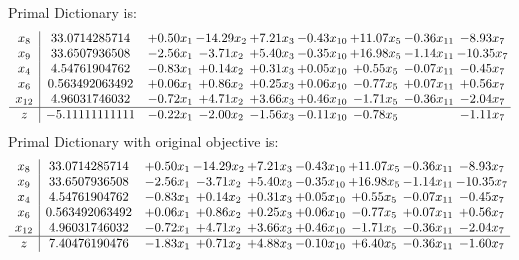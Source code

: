 \documentclass[8pt]{article}
\begin{document}
Primal Dictionary is:
\[\begin{array}{c| c c@{\hskip 2pt} c@{\hskip 2pt} c@{\hskip 2pt} c@{\hskip 2pt} c@{\hskip 2pt} c@{\hskip 2pt} c@{\hskip 2pt} }
 x_{8}   &  33.0714285714 & +  0.50 x_{1} & -14.29 x_{2} & +  7.21 x_{3} & -0.43 x_{10} & + 11.07 x_{5} & -0.36 x_{11} & -8.93 x_{7}\\
 x_{9}   &  33.6507936508 & -2.56 x_{1} & -3.71 x_{2} & +  5.40 x_{3} & -0.35 x_{10} & + 16.98 x_{5} & -1.14 x_{11} & -10.35 x_{7}\\
 x_{4}   &  4.54761904762 & -0.83 x_{1} & +  0.14 x_{2} & +  0.31 x_{3} & +  0.05 x_{10} & +  0.55 x_{5} & -0.07 x_{11} & -0.45 x_{7}\\
 x_{6}   &  0.563492063492 & +  0.06 x_{1} & +  0.86 x_{2} & +  0.25 x_{3} & +  0.06 x_{10} & -0.77 x_{5} & +  0.07 x_{11} & +  0.56 x_{7}\\
 x_{12}   &  4.96031746032 & -0.72 x_{1} & +  4.71 x_{2} & +  3.66 x_{3} & +  0.46 x_{10} & -1.71 x_{5} & -0.36 x_{11} & -2.04 x_{7}\\
\hline
z    &  -5.11111111111 & -0.22 x_{1} & -2.00 x_{2} & -1.56 x_{3} & -0.11 x_{10} & -0.78 x_{5} &   & -1.11 x_{7}\\
\end{array}\]
Primal Dictionary with original objective is:
\[\begin{array}{c| c c@{\hskip 2pt} c@{\hskip 2pt} c@{\hskip 2pt} c@{\hskip 2pt} c@{\hskip 2pt} c@{\hskip 2pt} c@{\hskip 2pt} }
 x_{8}   &  33.0714285714 & +  0.50 x_{1} & -14.29 x_{2} & +  7.21 x_{3} & -0.43 x_{10} & + 11.07 x_{5} & -0.36 x_{11} & -8.93 x_{7}\\
 x_{9}   &  33.6507936508 & -2.56 x_{1} & -3.71 x_{2} & +  5.40 x_{3} & -0.35 x_{10} & + 16.98 x_{5} & -1.14 x_{11} & -10.35 x_{7}\\
 x_{4}   &  4.54761904762 & -0.83 x_{1} & +  0.14 x_{2} & +  0.31 x_{3} & +  0.05 x_{10} & +  0.55 x_{5} & -0.07 x_{11} & -0.45 x_{7}\\
 x_{6}   &  0.563492063492 & +  0.06 x_{1} & +  0.86 x_{2} & +  0.25 x_{3} & +  0.06 x_{10} & -0.77 x_{5} & +  0.07 x_{11} & +  0.56 x_{7}\\
 x_{12}   &  4.96031746032 & -0.72 x_{1} & +  4.71 x_{2} & +  3.66 x_{3} & +  0.46 x_{10} & -1.71 x_{5} & -0.36 x_{11} & -2.04 x_{7}\\
\hline
z    &  7.40476190476 & -1.83 x_{1} & +  0.71 x_{2} & +  4.88 x_{3} & -0.10 x_{10} & +  6.40 x_{5} & -0.36 x_{11} & -1.60 x_{7}\\
\end{array}\]
\end{document}

